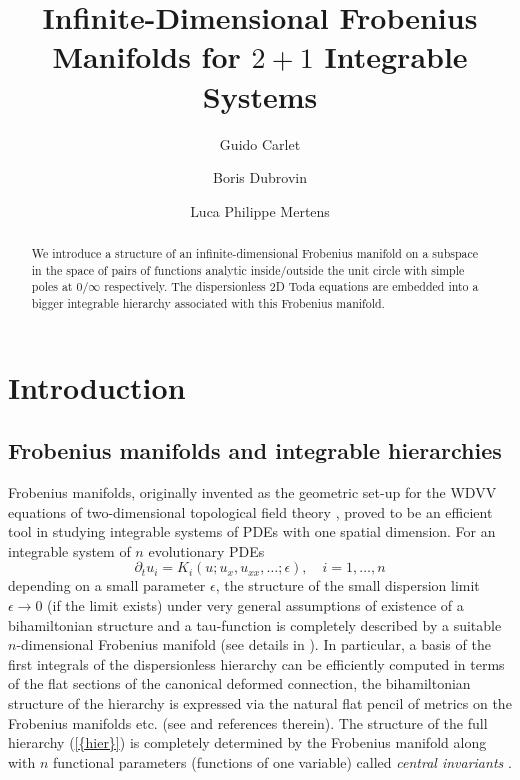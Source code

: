 \documentclass[numbook, envcountsame, envcountreset]{svjour3}
\begin{document}
\title{Infinite-Dimensional Frobenius Manifolds for $2+1$ Integrable Systems}
\subtitle{}

\author{Guido Carlet \and Boris Dubrovin \and Luca Philippe Mertens}


\maketitle

\begin{abstract}
We introduce a structure of an infinite-dimensional Frobenius manifold on a subspace in the space of pairs of functions analytic inside/outside the unit circle with simple poles at $0/\infty$ respectively. The dispersionless 2D Toda equations are embedded into a bigger integrable hierarchy associated with this Frobenius manifold.
\end{abstract}


\section{Introduction}

\subsection{\bf Frobenius manifolds and integrable hierarchies}\par 
Frobenius manifolds, originally invented \cite{D92} as the geometric set-up for the WDVV equations of two-dimensional topological field theory \cite{wi}, proved to be an efficient tool in studying integrable systems of PDEs with one spatial dimension. For an integrable system of $n$ evolutionary PDEs
\begin{equation}\label{hier}
{\partial}_t u_i =K_i(u; u_x, u_{xx}, \dots; \epsilon), \quad i=1, \dots, n
\end{equation}
depending on a small parameter $\epsilon$, the structure of the small dispersion limit $\epsilon\to 0$ (if the limit exists) under very general assumptions of existence of a bihamiltonian structure and a tau-function is completely described by a suitable $n$-dimensional Frobenius manifold (see details in \cite{normal}). In particular, a basis of the first integrals of the dispersionless hierarchy can be efficiently computed in terms of the flat sections of the canonical deformed connection, the bihamiltonian structure of the hierarchy is expressed via the natural flat pencil of metrics on the Frobenius manifolds etc. (see \cite{icm} and references therein). The structure of the full hierarchy {(\ref{{hier}})} is completely determined by the Frobenius manifold along with $n$ functional parameters (functions of one variable) called {\it central invariants} \cite{cpam}.
\end{document}
